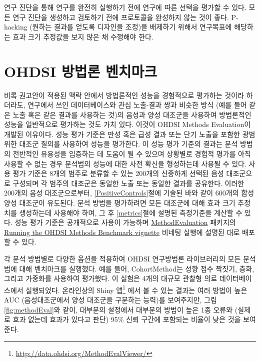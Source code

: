 \documentclass[10.5pt]{book}
\let\rmarkdownfootnote\footnote%
\def\footnote{\protect\rmarkdownfootnote}
\theoremstyle{definition}
\theoremstyle{definition}
\theoremstyle{definition}
\theoremstyle{remark}
\let\BeginKnitrBlock\begin \let\EndKnitrBlock\end
\begin{document}
\BeginKnitrBlock{rmdimportant}
연구 진단을 통해 연구를 완전히 실행하기 전에 연구에 따른 선택을 평가할
수 있다. 모든 연구 진단을 생성하고 검토하기 전에 프로토콜을 완성하지
않는 것이 좋다. P-hacking (원하는 결과를 얻도록 디자인을 조정)을
배제하기 위해서 연구목표에 해당하는 효과 크기 추정값을 보지 않은 채
수행해야 한다.
\EndKnitrBlock{rmdimportant}

\section{OHDSI 방법론 벤치마크}\label{ohdsi--}


비록 권고안이 적용된 맥락 안에서 방법론적인 성능을 경험적으로 평가하는
것이라 하더라도, 연구에서 쓰인 데이터베이스와 관심 노출-결과 쌍과 비슷한
방식 (예를 들어 같은 노출 혹은 같은 결과를 사용하는 것)의 음성과 양성
대조군을 사용하여 방법론적인 성능을 일반적으로 평가하는 것도 가치 있다.
이것이 OHDSI Methods Evaluation이 개발된 이유이다. 성능 평가 기준은 만성
혹은 급성 결과 또는 단기 노출을 포함한 광범위한 대조군 질의를 사용하여
성능을 평가한다. 이 성능 평가 기준의 결과는 분석 방법의 전반적인
유용성을 입증하는 데 도움이 될 수 있으며 상황별로 경험적 평가를 아직
사용할 수 없는 경우 분석법의 성능에 대한 사전 확신을 형성하는데 사용될
수 있다. 사용 평가 기준은 8개의 범주로 분류할 수 있는 200개의 신중하게
선택된 음성 대조군으로 구성되며 각 범주의 대조군은 동일한 노출 또는
동일한 결과를 공유한다. 이러한 200개의 음성 대조군으로부터,
\ref{PositiveControls}절에 기술된 바와 같이 600개의 합성 양성 대조군이
유도된다. 분석 방법을 평가하려면 모든 대조군에 대해 효과 크기 추정치를
생성하는데 사용해야 하며, 그 후 \ref{metrics}절에 설명된 측정기준을
계산할 수 있다. 성능 평가 기준은 공개적으로 사용이 가능하며
\href{https://ohdsi.github.io/MethodEvaluation/}{MethodEvaluation}
패키지의
\href{https://ohdsi.github.io/MethodEvaluation/articles/OhdsiMethodsBenchmark.html}{Running
the OHDSI Methods Benchmark vignette} 비네팅 실행에 설명된 대로 배포할
수 있다.

각 분석 방법별로 다양한 옵션을 적용하여 OHDSI 연구방법론 라이브러리의
모든 분석법에 대해 벤치마크를 실행했다. 예를 들어, CohortMethod는 성향
점수 짝짓기, 층화, 그리고 가중화를 사용하여 평가했다. 이 실험은 4개의
대규모 관찰형 의료 데이터베이스에서 실행되었다. 온라인상의 Shiny
앱\footnote{\url{http://data.ohdsi.org/MethodEvalViewer/}} 에서 볼 수
있는 결과는 여러 방법이 높은 AUC (음성대조군에서 양성 대조군을 구분하는
능력)를 보여주지만, 그림 \ref{fig:methodEval}와 같이, 대부분의 설정에서
대부분의 방법이 높은 1종 오류와 (실제로 효과 없는데 효과가 있다고 판단)
95\% 신뢰 구간에 포함되는 비율이 낮은 것을 보여준다.
\end{document}
